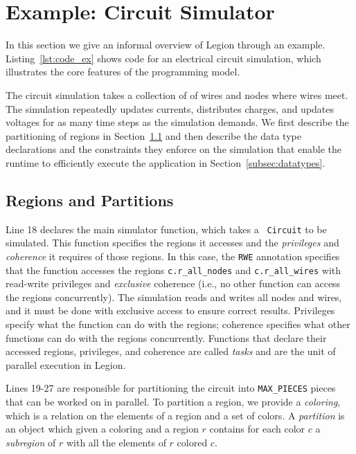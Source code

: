 \section{Example: Circuit Simulator}
\label{sec:ex}

%

In this section we give an informal overview of Legion through an example.
Listing~\ref{lst:code_ex} shows code for an electrical
circuit simulation, which illustrates the core features of the programming model.

The circuit simulation takes a collection of
of wires and nodes where wires meet.  
The simulation repeatedly updates
currents, distributes charges, and updates voltages for as many
time steps as the simulation demands.  We first
describe the partitioning of regions in Section~\ref{subsec:partitioning}
and then describe the data type declarations 
and the constraints they enforce on the simulation that enable
the runtime to efficiently execute the application
in Section~\ref{subsec:datatypes}.

\subsection{Regions and Partitions}
\label{subsec:partitioning}

Line 18 declares the main simulator function, which takes a {\tt
Circuit} to be simulated.  This function specifies the regions it 
accesses and the {\em privileges} and {\em coherence} it requires of those regions.
In this case, the {\tt RWE} annotation specifies that the function
accesses the regions {\tt c.r\_all\_nodes} and {\tt c.r\_all\_wires}
with read-write privileges and {\em exclusive} coherence (i.e., no other
function can access the regions concurrently).  The simulation 
reads and writes all nodes and wires, and it must be done
with exclusive access to ensure correct results.  Privileges specify what
the function can do with the regions; coherence specifies what other
functions can do with the regions concurrently.  Functions that
declare their accessed regions, privileges, and coherence are called {\em tasks}
and are the unit of parallel execution in Legion.

Lines 19-27 are responsible for partitioning the circuit into {\tt MAX\_PIECES}
pieces that can be worked on in parallel.  To partition a region, we
provide a {\em coloring}, which is a relation on the elements
of a region and a set of colors.  A {\em partition} is an object which given
a coloring and a region $r$ contains for each color $c$ a {\em subregion} of $r$
with all the elements of $r$ colored $c$.

